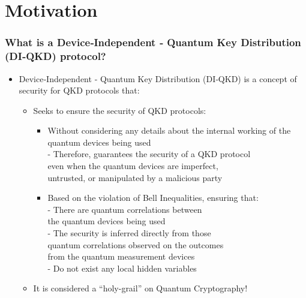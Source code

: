 \documentclass{beamer}
\begin{document}
    \section{Motivation}

		\begin{frame}
			\frametitle{\footnotesize What is a Device‑Independent ‑ Quantum Key Distribution (DI‑QKD) protocol?}

            \vspace{2.5ex}
            \begin{itemize}
                \item Device‑Independent ‑ Quantum Key Distribution (DI‑QKD) is a concept of security for QKD protocols that:
                \begin{itemize}
                    \item Seeks to ensure the security of QKD protocols:
                    \begin{itemize}
                        \item Without considering any details about the internal working of the quantum devices being used\\
                        - Therefore, guarantees the security of a QKD protocol\\\hspace{0.5em}even when the quantum devices are imperfect,\\\hspace{0.5em}untrusted, or manipulated by a malicious party
                        \item Based on the violation of Bell Inequalities, ensuring that:\\
                        - There are quantum correlations between\\\hspace{0.5em}the quantum devices being used\\
                        - The security is inferred directly from those\\\hspace{0.5em}quantum correlations observed on the outcomes\\\hspace{0.5em}from the quantum measurement devices\\
                        - Do not exist any local hidden variables
                    \end{itemize}
                    \item It is considered a ``holy-grail'' on Quantum Cryptography!
                \end{itemize}
            \end{itemize}
		\end{frame}
\end{document}
